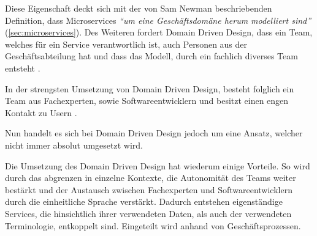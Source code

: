 Diese Eigenschaft deckt sich mit der von Sam Newman beschriebenden Definition, dass Microservices \textit{\enquote{um eine Geschäftsdomäne herum modelliert sind}} (\cref{sec:microservices}). Des Weiteren fordert Domain Driven Design, dass ein Team, welches für ein Service verantwortlich ist, auch Personen aus der Geschäftsabteilung hat und dass das Modell, durch ein fachlich diverses Team entsteht \parencite[vgl.][S. 32 ff.]{evans_domain-driven_2003}. 

In der strengsten Umsetzung von Domain Driven Design, besteht folglich ein Team aus Fachexperten, sowie Softwareentwicklern und besitzt einen engen Kontakt zu Usern \parencites[vgl.][Kap. 4.3]{wolff_microservices_2018}.

Nun handelt es sich bei Domain Driven Design jedoch um eine Ansatz, welcher nicht immer absolut umgesetzt wird.

Die Umsetzung des Domain Driven Design hat wiederum einige Vorteile. So wird durch das abgrenzen in einzelne Kontexte, die Autonomität des Teams weiter bestärkt und der Austausch zwischen Fachexperten und Softwareentwicklern durch die einheitliche Sprache verstärkt. Dadurch entstehen eigenständige Services, die hinsichtlich ihrer verwendeten Daten, als auch der verwendeten Terminologie, entkoppelt sind. Eingeteilt wird anhand von Geschäftsprozessen.

